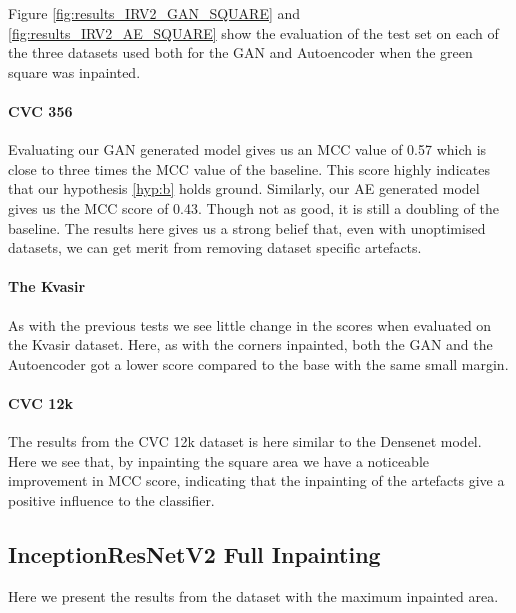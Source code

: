 \noindent Figure \ref{fig:results_IRV2_GAN_SQUARE} and \ref{fig:results_IRV2_AE_SQUARE} show the evaluation of the test set on each of the three datasets used both for the GAN and Autoencoder when the green square was inpainted. 

\paragraph{CVC 356}
Evaluating our GAN generated model gives us an MCC value of 0.57 which is close to three times the MCC value of the baseline.  This score highly indicates that our hypothesis \ref{hyp:b} holds ground.
Similarly, our AE generated model gives us the MCC score of 0.43. Though not as good, it is still a doubling of the baseline.
The results here gives us a strong belief that, even with unoptimised datasets, we can get merit from removing dataset specific artefacts.


\paragraph{The Kvasir}
As with the previous tests we see little change in the scores when evaluated on the Kvasir dataset.
Here, as with the corners inpainted, both the GAN and the Autoencoder got a lower score compared to the base with the same small margin. 


\paragraph{CVC 12k}
The results from the CVC 12k dataset is here similar to the Densenet model. Here we see that, by inpainting the square area we have a noticeable improvement in MCC score, indicating that the inpainting of the artefacts give a positive influence to the classifier.













\subsection{InceptionResNetV2 Full Inpainting}
Here we present the results from the dataset with the maximum inpainted area.


